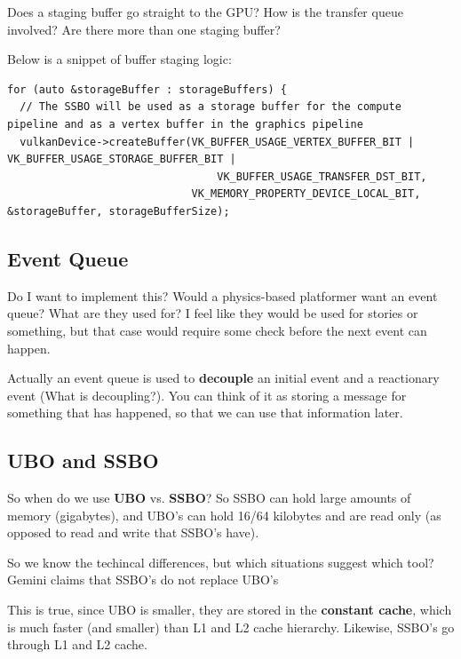 \documentclass{article}
\begin{document}
\par Does a staging buffer go straight to
the GPU? How is the transfer queue involved? Are there more than one
staging buffer?

\par Below is a snippet of buffer staging logic:
\begin{Verbatim}[fontsize=\footnotesize]
for (auto &storageBuffer : storageBuffers) {
  // The SSBO will be used as a storage buffer for the compute pipeline and as a vertex buffer in the graphics pipeline
  vulkanDevice->createBuffer(VK_BUFFER_USAGE_VERTEX_BUFFER_BIT | VK_BUFFER_USAGE_STORAGE_BUFFER_BIT |
                                 VK_BUFFER_USAGE_TRANSFER_DST_BIT,
                             VK_MEMORY_PROPERTY_DEVICE_LOCAL_BIT, &storageBuffer, storageBufferSize);
\end{Verbatim}

\subsection*{Event Queue}
\par Do I want to implement this? Would a physics-based platformer
want an event queue? What are they used for? I feel like they would
be used for stories or something, but that case would require some
check before the next event can happen.

\par Actually an event queue is used to \textbf{decouple} an initial
event and a reactionary event (What is decoupling?). You can think of
it as storing a message for something that has happened, so that we
can use that information later.

\subsection*{UBO and SSBO}
\par So when do we use \textbf{UBO} vs. \textbf{SSBO}? So SSBO can
hold large amounts of memory (gigabytes), and UBO's can hold 16/64
kilobytes and are read only (as opposed to read and write that SSBO's have).

\par So we know the techincal differences, but which situations
suggest which tool? Gemini claims that SSBO's do not replace UBO's

\par This is true, since UBO is smaller, they are stored in the
\textbf{constant cache}, which is much faster (and smaller) than L1 and L2 cache
hierarchy. Likewise, SSBO's go through L1 and L2 cache.
\end{document}
